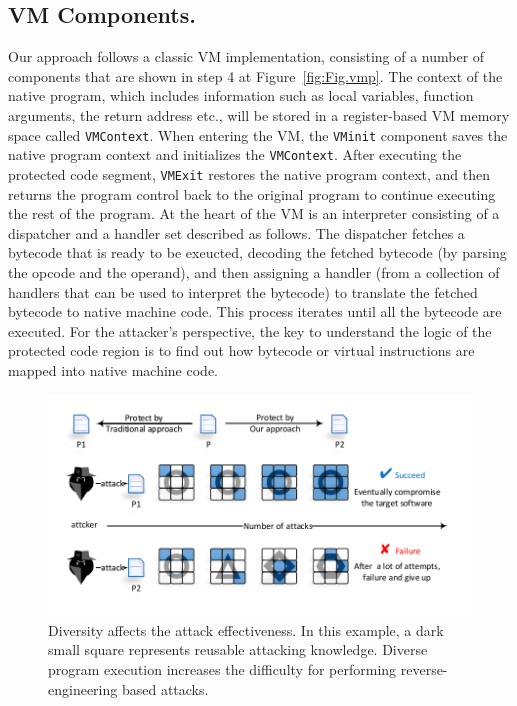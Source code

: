 \subsection{VM Components.} Our approach follows a classic VM implementation,
consisting of a number of components that are shown
in step 4 at Figure~\ref{fig:Fig.vmp}.
The context of the native program, which includes
information such as local variables, function arguments, the return address etc.,
will be stored in a register-based VM memory space called \texttt{VMContext}. When entering the VM, the \texttt{VMinit}
component saves the native program context and initializes the
\texttt{VMContext}. After executing the protected code segment,  \texttt{VMExit} restores the
native program context, and then returns the program control back to the
original program to continue executing the rest of the program.
At the heart of the VM is an interpreter consisting of a
dispatcher and a handler set described as follows. The dispatcher fetches a
bytecode that is ready to be exeucted, decoding the fetched
bytecode (by parsing the opcode and the operand), and then assigning a handler (from a collection of handlers that can be used
to interpret the bytecode)  to translate the fetched bytecode to native
machine code. This process iterates until all the bytecode are executed.
For the attacker's perspective, the key to understand the
logic of the protected code region is to find out how
bytecode or virtual instructions are mapped into native machine code.

\begin{figure}[t]%
    \centering
    \includegraphics[width=0.7\columnwidth]{figure/figattack.pdf}
    \caption{Diversity affects the attack effectiveness. In this example, a dark small square represents reusable attacking knowledge. Diverse program execution increases the difficulty for performing reverse-engineering based attacks.}\label{fig:Fig.attack}
\end{figure}

